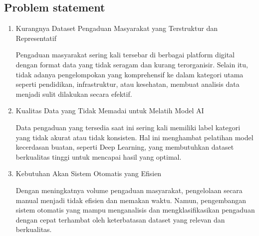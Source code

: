 \documentclass[12pt,a4paper]{article}
\begin{document}
\subsection{Problem statement}
\begin{enumerate}
  \item Kurangnya Dataset Pengaduan Masyarakat yang Terstruktur dan Representatif
  \begin{adjustwidth}{0em}{0pt} 
  Pengaduan masyarakat sering kali tersebar di berbagai platform digital dengan format data yang tidak seragam dan kurang terorganisir. Selain itu, tidak adanya pengelompokan yang komprehensif ke dalam kategori utama seperti pendidikan, infrastruktur, atau kesehatan, membuat analisis data menjadi sulit dilakukan secara efektif.
  \end{adjustwidth}
  \item Kualitas Data yang Tidak Memadai untuk Melatih Model AI
  \begin{adjustwidth}{0em}{0pt} 
  Data pengaduan yang tersedia saat ini sering kali memiliki label kategori yang tidak akurat atau tidak konsisten. Hal ini menghambat pelatihan model kecerdasan buatan, seperti Deep Learning, yang membutuhkan dataset berkualitas tinggi untuk mencapai hasil yang optimal.
  \end{adjustwidth}
  \item Kebutuhan Akan Sistem Otomatis yang Efisien
  \begin{adjustwidth}{0em}{0pt} 
  Dengan meningkatnya volume pengaduan masyarakat, pengelolaan secara manual menjadi tidak efisien dan memakan waktu. Namun, pengembangan sistem otomatis yang mampu menganalisis dan mengklasifikasikan pengaduan dengan cepat terhambat oleh keterbatasan dataset yang relevan dan berkualitas.
  \end{adjustwidth}
\end{enumerate}
\end{document}
